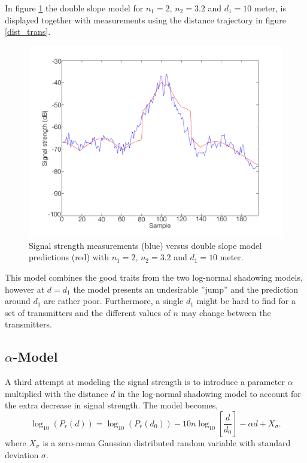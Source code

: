\documentclass{LTHthesis}
\begin{document}
In figure \ref{double_slope} the double slope model for $n_1=2$, $n_2=3.2$ and $d_1=10$ meter, is displayed together with measurements using the distance trajectory in figure \ref{dist_trans}.
%
\begin{figure}[!hbt]

\includegraphics[width=1\textwidth ]{images/signal_model/double_slope}
\caption{Signal strength measurements (blue) versus double slope model predictions (red) with $n_1=2$, $n_2=3.2$ and $d_1=10$ meter.}\label{double_slope}
\end{figure}

This model combines the good traits from the two log-normal shadowing models, however at $d=d_1$ the model presents an undesirable ''jump'' and the prediction around $d_1$ are rather poor. Furthermore, a single $d_1$ might be hard to find for a set of transmitters and the different values of $n$ may change between the transmitters.
%
\subsection{$\alpha$-Model} %
%
A third attempt at modeling the signal strength is to introduce a parameter $\alpha$ multiplied with the distance $d$ in the log-normal shadowing model to account for the extra decrease in signal strength.  The model becomes,
%
\begin{equation}
\log_{10}({P_r(d)})=\log_{10}({P_r(d_0)})-10n\log_{10}\left[{\frac{d}{d_0}}\right] - \alpha d+ X_\sigma.
\end{equation}
%
where $X_\sigma$ is a zero-mean Gaussian distributed random variable with standard deviation $\sigma$.
\end{document}
